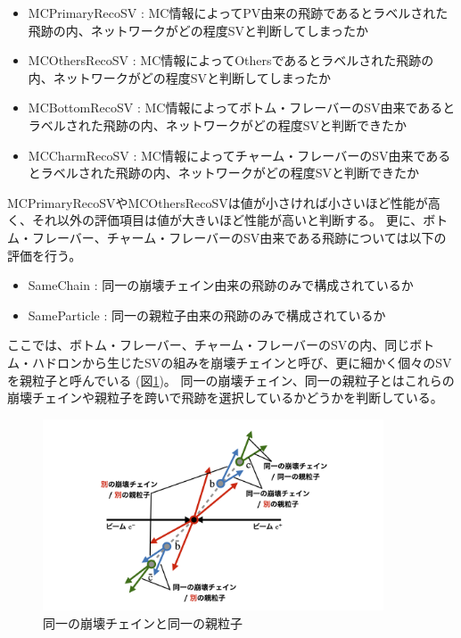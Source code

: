 \begin{itemize}
 \item MCPrimaryRecoSV : MC情報によってPV由来の飛跡であるとラベルされた飛跡の内、ネットワークがどの程度SVと判断してしまったか
 \item MCOthersRecoSV : MC情報によってOthersであるとラベルされた飛跡の内、ネットワークがどの程度SVと判断してしまったか
 \item MCBottomRecoSV : MC情報によってボトム・フレーバーのSV由来であるとラベルされた飛跡の内、ネットワークがどの程度SVと判断できたか
 \item MCCharmRecoSV : MC情報によってチャーム・フレーバーのSV由来であるとラベルされた飛跡の内、ネットワークがどの程度SVと判断できたか
\end{itemize}

MCPrimaryRecoSVやMCOthersRecoSVは値が小さければ小さいほど性能が高く、それ以外の評価項目は値が大きいほど性能が高いと判断する。
更に、ボトム・フレーバー、チャーム・フレーバーのSV由来である飛跡については以下の評価を行う。

\begin{itemize}
 \item SameChain : 同一の崩壊チェイン由来の飛跡のみで構成されているか
 \item SameParticle : 同一の親粒子由来の飛跡のみで構成されているか
\end{itemize}

ここでは、ボトム・フレーバー、チャーム・フレーバーのSVの内、同じボトム・ハドロンから生じたSVの組みを崩壊チェインと呼び、更に細かく個々のSVを親粒子と呼んでいる (図\ref{4-2-2-1SameChainSameParticle})。
同一の崩壊チェイン、同一の親粒子とはこれらの崩壊チェインや親粒子を跨いで飛跡を選択しているかどうかを判断している。

\begin{figure}[htbp]
 \centering
 \includegraphics[width=0.9\textwidth, clip]{Figure/4VertexFinderwithDL/4-2-2-1SameChainSameParticle.png}
 \caption[同一の崩壊チェインと同一の親粒子]{同一の崩壊チェインと同一の親粒子}
 \label{4-2-2-1SameChainSameParticle}
\end{figure}

